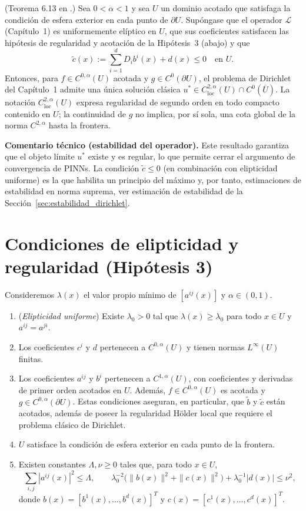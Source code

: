 (Teorema 6.13 en \cite{gilbarg2001elliptic}.)
Sea $0<\alpha<1$ y sea $U$ un dominio acotado que satisfaga la condición de esfera exterior en cada punto de
$\partial U$. Supóngase que el operador $\mathcal{L}$ (Capítulo~1) es uniformemente elíptico en $U$,
que sus coeficientes satisfacen las hipótesis de regularidad y acotación de la Hipótesis~3 (abajo) y que
\[
\tilde c(x):=\sum_{i=1}^d D_i b^i(x)+d(x)\le 0 \quad \text{en } U.
\]
Entonces, para $f\in C^{0,\alpha}(U)$ acotada y $g\in C^0(\partial U)$, el problema de Dirichlet del Capítulo~1 admite una única solución clásica
$u^*\in C^{2,\alpha}_{\mathrm{loc}}(U)\cap C^0(\overline U)$.
La notación $C^{2,\alpha}_{\mathrm{loc}}(U)$ expresa regularidad de segundo orden en todo compacto contenido en $U$;
la continuidad de $g$ no implica, por sí sola, una cota global de la norma $C^{2,\alpha}$ hasta la frontera.

\medskip
\noindent\textbf{Comentario técnico (estabilidad del operador).}
Este resultado garantiza que el objeto límite $u^*$ existe y es regular, lo que permite cerrar el
argumento de convergencia de PINNs. La condición $\tilde c\le 0$ (en combinación con elipticidad uniforme)
es la que habilita un principio del máximo y, por tanto, estimaciones de estabilidad en norma suprema,
ver estimación de estabilidad de la Sección~\ref{sec:estabilidad_dirichlet}.

\section{Condiciones de elipticidad y regularidad (Hipótesis 3)}

Consideremos $\lambda(x)$ el valor propio mínimo de $[a^{ij}(x)]$ y $\alpha\in(0,1)$.

\begin{enumerate}
\item (\textit{Elipticidad uniforme}) Existe $\lambda_0>0$ tal que $\lambda(x)\ge \lambda_0$ para todo $x\in U$
y $a^{ij}=a^{ji}$.
\item Los coeficientes $c^i$ y $d$ pertenecen a $C^{0,\alpha}(U)$ y tienen normas $L^\infty(U)$ finitas.
\item Los coeficientes $a^{ij}$ y $b^i$ pertenecen a $C^{1,\alpha}(U)$, con coeficientes y derivadas de primer orden acotados en $U$. Además, $f\in C^{0,\alpha}(U)$ es acotada y $g\in C^{0,\alpha}(\partial U)$. Estas condiciones aseguran, en particular, que $\widetilde b$ y $\widetilde c$ están acotados, además de poseer la regularidad H\"older local que requiere el problema clásico de Dirichlet.
\item $U$ satisface la condición de esfera exterior en cada punto de la frontera.
\item Existen constantes $\Lambda,\nu\ge 0$ tales que, para todo $x\in U$,
\[
\sum_{i,j}|a^{ij}(x)|^2\le \Lambda,\qquad
\lambda_0^{-2}\big(\|b(x)\|^2+\|c(x)\|^2\big)+\lambda_0^{-1}|d(x)|\le \nu^2,
\]
donde $b(x)=[b^1(x),\dots,b^d(x)]^T$ y $c(x)=[c^1(x),\dots,c^d(x)]^T$.
\end{enumerate}

